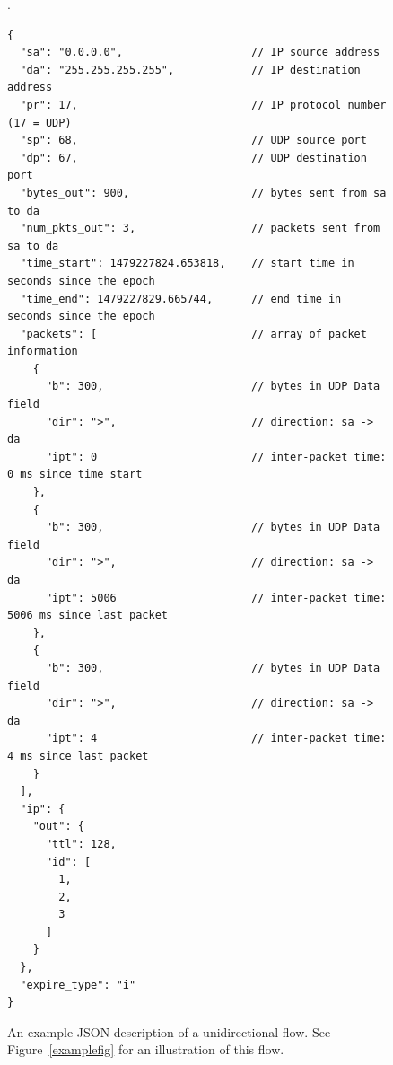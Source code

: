 \documentclass{book}
\begin{document}
\begin{figure}
  \caption{An example JSON description of a unidirectional flow.  See
    Figure~\ref{examplefig} for an illustration of this flow.  }
  \label{example}.
\begin{verbatim}
{
  "sa": "0.0.0.0",                    // IP source address
  "da": "255.255.255.255",            // IP destination address
  "pr": 17,                           // IP protocol number (17 = UDP)
  "sp": 68,                           // UDP source port 
  "dp": 67,                           // UDP destination port
  "bytes_out": 900,                   // bytes sent from sa to da
  "num_pkts_out": 3,                  // packets sent from sa to da
  "time_start": 1479227824.653818,    // start time in seconds since the epoch
  "time_end": 1479227829.665744,      // end time in seconds since the epoch
  "packets": [                        // array of packet information
    {                                  
      "b": 300,                       // bytes in UDP Data field
      "dir": ">",                     // direction: sa -> da
      "ipt": 0                        // inter-packet time: 0 ms since time_start
    },
    {
      "b": 300,                       // bytes in UDP Data field
      "dir": ">",                     // direction: sa -> da
      "ipt": 5006                     // inter-packet time: 5006 ms since last packet
    },
    {
      "b": 300,                       // bytes in UDP Data field
      "dir": ">",                     // direction: sa -> da
      "ipt": 4                        // inter-packet time: 4 ms since last packet
    }
  ],
  "ip": {                            
    "out": {
      "ttl": 128,
      "id": [
        1,
        2,
        3
      ]
    }
  },
  "expire_type": "i"
}
\end{verbatim}
\end{figure}
\end{document}
